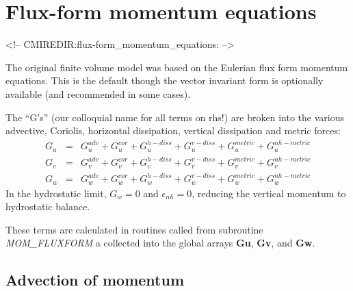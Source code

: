 
\section{Flux-form momentum equations}
\label{sec:flux-form_momentum_equations}
\begin{rawhtml}
<!-- CMIREDIR:flux-form_momentum_equations: -->
\end{rawhtml}

The original finite volume model was based on the Eulerian flux form
momentum equations. This is the default though the vector invariant
form is optionally available (and recommended in some cases).

The ``G's'' (our colloquial name for all terms on rhs!) are broken
into the various advective, Coriolis, horizontal dissipation, vertical
dissipation and metric forces:
\begin{eqnarray}
G_u & = & G_u^{adv} + G_u^{cor} + G_u^{h-diss} + G_u^{v-diss} +
G_u^{metric} + G_u^{nh-metric} \label{eq:gsplit_momu} \\
G_v & = & G_v^{adv} + G_v^{cor} + G_v^{h-diss} + G_v^{v-diss} +
G_v^{metric} + G_v^{nh-metric} \label{eq:gsplit_momv} \\
G_w & = & G_w^{adv} + G_w^{cor} + G_w^{h-diss} + G_w^{v-diss} +
G_w^{metric} + G_w^{nh-metric} \label{eq:gsplit_momw}
\end{eqnarray}
In the hydrostatic limit, $G_w=0$ and $\epsilon_{nh}=0$, reducing the
vertical momentum to hydrostatic balance.

These terms are calculated in routines called from subroutine {\em
MOM\_FLUXFORM} a collected into the global arrays {\bf Gu}, {\bf Gv},
and {\bf Gw}.



\subsection{Advection of momentum}

